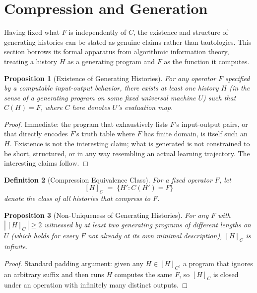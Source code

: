 \documentclass[11pt]{article}
\newtheorem{definition}{Definition}[section]
\newtheorem{proposition}[definition]{Proposition}
\begin{document}
\section{Compression and Generation}

Having fixed what $F$ is independently of $C$, the existence and structure of generating histories can be stated as genuine claims rather than tautologies. This section borrows its formal apparatus from algorithmic information theory, treating a history $H$ as a generating program and $F$ as the function it computes.

\begin{proposition}[Existence of Generating Histories]
For any operator $F$ specified by a computable input-output behavior, there exists at least one history $H$ (in the sense of a generating program on some fixed universal machine $U$) such that $C(H)=F$, where $C$ here denotes $U$'s evaluation map.
\end{proposition}

\begin{proof}
Immediate: the program that exhaustively lists $F$'s input-output pairs, or that directly encodes $F$'s truth table where $F$ has finite domain, is itself such an $H$. Existence is not the interesting claim; what is generated is not constrained to be short, structured, or in any way resembling an actual learning trajectory. The interesting claims follow.
\end{proof}

\begin{definition}[Compression Equivalence Class]
For a fixed operator $F$, let
\[
[H]_C \;=\; \{H' : C(H') = F\}
\]
denote the class of all histories that compress to $F$.
\end{definition}

\begin{proposition}[Non-Uniqueness of Generating Histories]
For any $F$ with $|\,[H]_C\,| \geq 2$ witnessed by at least two generating programs of different lengths on $U$ (which holds for every $F$ not already at its own minimal description), $[H]_C$ is infinite.
\end{proposition}

\begin{proof}
Standard padding argument: given any $H\in[H]_C$, a program that ignores an arbitrary suffix and then runs $H$ computes the same $F$, so $[H]_C$ is closed under an operation with infinitely many distinct outputs.
\end{proof}
\end{document}

